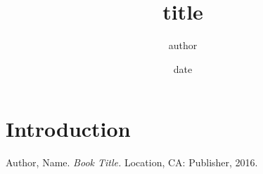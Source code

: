 \documentclass{ec}
\begin{document}
\title{title}
\author{author}
\date{date}

\maketitle
\thesis{}
\tableofcontents

\section{Introduction}

\begin{thebibliography}
 Author, Name. {\em Book Title.} Location,
CA: Publisher, 2016.
\end{thebibliography}
\end{document}
